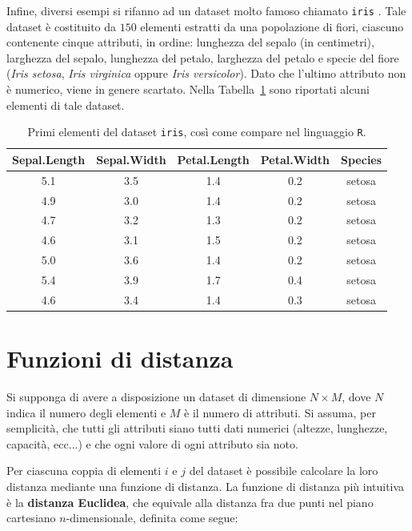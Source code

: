\documentclass[a4paper, 12pt]{report}
\begin{document}
			Infine, diversi esempi si rifanno ad un dataset molto famoso
			chiamato \texttt{iris} \cite{https://doi.org/10.1111/j.1469-1809.1936.tb02137.x}.
			Tale dataset è costituito da $150$ elementi estratti da una
			popolazione di fiori, ciascuno contenente cinque attributi,
			in ordine: lunghezza del sepalo (in centimetri), larghezza
			del sepalo, lunghezza del petalo, larghezza del petalo e
			specie del fiore (\emph{Iris setosa}, \emph{Iris virginica}
			oppure \emph{Iris versicolor}). Dato che l'ultimo attributo
			non è numerico, viene in genere scartato. Nella
			Tabella~\ref{tab:iris-sample} sono riportati alcuni
			elementi di tale dataset.

			\begin{table}[H]
				\centering
				\begin{tabular}{c c c c c}
					\hline
					\textbf{Sepal.Length} &
					\textbf{Sepal.Width} &
					\textbf{Petal.Length} &
					\textbf{Petal.Width} &
					\textbf{Species} \\
					\hline
					5.1 & 3.5 & 1.4 & 0.2 & setosa \\
					4.9 & 3.0 & 1.4 & 0.2 & setosa \\
					4.7 & 3.2 & 1.3 & 0.2 & setosa \\
					4.6 & 3.1 & 1.5 & 0.2 & setosa \\
					5.0 & 3.6 & 1.4 & 0.2 & setosa \\
					5.4 & 3.9 & 1.7 & 0.4 & setosa \\
					4.6 & 3.4 & 1.4 & 0.3 & setosa \\
					\hline
				\end{tabular}
				\caption{Primi elementi del dataset \texttt{iris},
				così come compare nel linguaggio \texttt{R}.}
				\label{tab:iris-sample}
			\end{table}

		\section{Funzioni di distanza}

			Si supponga di avere a disposizione un dataset di dimensione
			$N \times M$, dove $N$ indica il numero degli elementi e $M$ è
			il numero di attributi. Si assuma, per semplicità, che tutti
			gli attributi siano tutti dati numerici (altezze, lunghezze,
			capacità, ecc...) e che ogni valore di ogni attributo sia noto.

			Per ciascuna coppia di elementi $i$ e $j$ del dataset è possibile
			calcolare la loro distanza mediante una funzione di distanza. La
			funzione di distanza più intuitiva è la \textbf{distanza Euclidea},
			che equivale alla distanza fra due punti nel piano cartesiano
			$n$-dimensionale, definita come segue:
\end{document}
